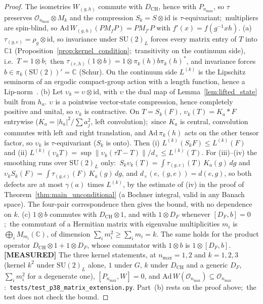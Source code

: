 \documentclass[11pt,a4paper]{article}
\theoremstyle{plain}
\theoremstyle{definition}
\newcommand{\nmax}{n_{\max}}
\newcommand{\Op}{\mathcal{O}}
\newcommand{\norm}[1]{\lVert #1 \rVert}
\newcommand{\C}{\mathbb{C}}
\newcommand{\SU}{\mathrm{SU}}
\newcommand{\DCH}{D_{\mathrm{CH}}}
\begin{document}
\begin{proof}
The isometries $W_{(g,h)}$ commute with $\DCH$, hence with
$P_{\nmax}$, so $\tau$ preserves $\Op_{\nmax} \otimes M_k$ and the
compression $S_k = S \otimes \mathrm{id}$ is $\tau$-equivariant;\
multipliers are spin-blind, so $\mathrm{Ad}\,W_{(g,h)}(P M_f P) = P
M_{f'} P$ with $f'(x) = f(g^{-1} x h)$.
(a) $\tau_{(g,e)} = \rho_g \otimes \mathrm{id}$, so invariance under
$\SU(2)_L$ forces every matrix entry of $T$ into $\C 1$
(Proposition~\ref{prop:kernel_condition};\ transitivity on the continuum
side), i.e.\ $T = 1 \otimes b$;\ then $\tau_{(e,h)}(1 \otimes b) = 1
\otimes \pi_k(h) b \pi_k(h)^*$, and invariance forces $b \in
\pi_k(\SU(2))' = \C$ (Schur). On the continuum side $L^{(k)}$ is the
Lipschitz seminorm of an ergodic compact-group action with a
length function, hence a Lip-norm~\cite{rieffel1998}.
(b) Let $\upsilon_k = \upsilon \otimes \mathrm{id}$, with $\upsilon$
the dual map of Lemma~\ref{lem:lifted_state} built from $h_a$.
$\upsilon$ is a pointwise vector-state compression, hence completely
positive and unital, so $\upsilon_k$ is contractive. On $T = S_k(F)$,
$\upsilon_k(T) = K_a * F$ entrywise ($K_a = |h_a|^2/\sum a_j^2$, left
convolution);\ since $K_a$ is central, convolution commutes with left
and right translation, and $\mathrm{Ad}\,\pi_k(h)$ acts on the other
tensor factor, so $\upsilon_k$ is $\tau$-equivariant ($S_k$ is onto).
Then (i) $L^{(k)}(S_k F) \le L^{(k)}(F)$ and (ii)
$L^{(k)}(\upsilon_k T) = \sup \norm{\upsilon_k(\tau T - T)}/d_\times
\le L^{(k)}(T)$. For (iii)--(iv) the smoothing runs over $\SU(2)_L$
only:\ $S_k \upsilon_k(T) = \int \tau_{(g,e)}(T)\, K_a(g)\, dg$ and
$\upsilon_k S_k(F) = \int \tau_{(g,e)}(F)\, K_a(g)\, dg$, and
$d_\times(e,(g,e)) = d(e,g)$, so both defects are at most $\gamma(a)$
times $L^{(k)}$, by the estimate of (iv) in the proof of
Theorem~\ref{thm:main_unconditional} (a Bochner integral, valid in any
Banach space). The four-pair correspondence then gives the bound, with
no dependence on $k$.
(c) $1 \otimes b$ commutes with $\DCH \otimes 1$, and with $1 \otimes
D_F$ whenever $[D_F, b] = 0$;\ the commutant of a Hermitian matrix with
eigenvalue multiplicities $m_i$ is $\bigoplus_i M_{m_i}(\C)$, of
dimension $\sum_i m_i^2 \ge \sum_i m_i = k$. The same holds for the
product operator $\DCH \otimes 1 + 1 \otimes D_F$, whose commutator with
$1 \otimes b$ is $1 \otimes [D_F, b]$.
\textbf{[MEASURED]} The three kernel statements, at $\nmax = 1, 2$ and
$k = 1, 2, 3$ (kernel $k^2$ under $\SU(2)_L$ alone, $1$ under $G$, $k$
under $\DCH$ and a generic $D_F$, $\sum_i m_i^2$ for a degenerate one),
$[P_{\nmax}, W] = 0$, and $\mathrm{Ad}\,W(\Op_{\nmax}) \subseteq
\Op_{\nmax}$:\ \texttt{tests/test\_p38\_matrix\_extension.py}. Part~(b)
rests on the proof above;\ the test does not check the bound.
\end{proof}
\end{document}
